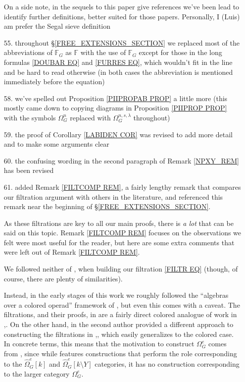 \documentclass{article}
\begin{document}
\begin{itemize}
	On a side note, in the sequels to this paper 
	{\color{red} give references}
	we've been lead to identify further definitions,
	better suited for those papers.
	Personally, I (Luis) am prefer the Segal sieve definition
	
	
	\item[55.] throughout \S \ref{FREE_EXTENSIONS_SECTION}
	we replaced most of the abbreviations of
	$\mathbb{F}_G$ as $\mathbb{F}$ with the use of $\mathbb{F}_G$
	except for those in the long formulas
	\eqref{DOUBAR EQ} and \eqref{FURRES EQ},
	which wouldn't fit in the line and be hard to read otherwise
	(in both cases the abbreviation is mentioned immediately before the equation)

	\item[58.]
	we've spelled out Proposition \ref{PIIPROPAB PROP}
	a little more (this mostly came down to copying
	diagrams in Proposition \ref{PIIPROP PROP}
	with the symbols 
	$\Omega^n_G$
	replaced with 
	$\Omega^{n,s,\lambda}_{G}$ throughout)
	
	\item[59.] the proof of Corollary \ref{LABIDEN COR}
	was revised to add more detail and to make
	some arguments clear

	\item[60.]
	the confusing wording in the second paragraph of 
	Remark \ref{NPXY_REM} has been revised

	\item[61.] added Remark \ref{FILTCOMP REM},
	a fairly lengthy remark that compares our filtration argument with others in the literature, and referenced this remark near the beginning of \S \ref{FREE_EXTENSIONS_SECTION}. 

	As these filtrations are key to all our main proofs,
	there is \emph{a lot} that can be said on this topic.
	Remark \ref{FILTCOMP REM} focuses on the observations we felt
	were most useful for the reader,
	but here are some extra comments that were left out of 
	Remark \ref{FILTCOMP REM}.
	
	We followed neither of \cite{BM03},\cite{BB17} 
	when building our filtration \eqref{FILTR EQ}
	(though, of course, there are plenty of similarities).
	
	Instead, in the early stages of this work 
	we roughly followed the ``algebras over a colored operad'' framework of \cite{WY18},
	but even this comes with a caveat.
	The filtrations, and their proofs, in \cite{WY18}
	are a fairly direct colored analogue
	of work in \cite{Ha10},\cite{Ha09}.
	On the other hand, in \cite{Pe16}
	the second author provided a different approach to constructing the filtrations in \cite{Ha10},\cite{Ha09},
	which easily generalizes to the colored case.
	In concrete terms,
	this means that the motivation to construct 
	$\Omega^e_G$ comes from \cite{Pe16},
	since while \cite{WY18}
	features constructions that perform the role
	corresponding to 
	the $\widehat{\Omega}^e_G[k]$ 
	and $\widehat{\Omega}^e_G[k \setminus Y]$
	categories,
	it has no construction corresponding to the larger category $\Omega^e_G$. 
	

\end{itemize}
\end{document}
